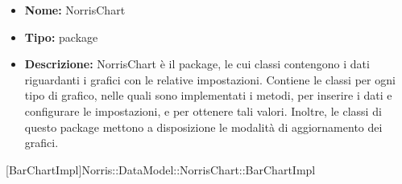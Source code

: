 	

			\begin{itemize}
			\item \textbf{Nome:} NorrisChart
			\item \textbf{Tipo:} package
			
			\item \textbf{Descrizione:} NorrisChart è il package, le cui classi contengono i dati riguardanti i grafici con le relative impostazioni. Contiene le classi per ogni tipo di grafico, nelle quali sono implementati i metodi, per inserire i dati e configurare le impostazioni, e per ottenere tali valori. Inoltre, le classi di questo package mettono a disposizione le modalità di aggiornamento dei grafici.
			\end{itemize}

			
			[BarChartImpl]{Norris::DataModel::NorrisChart::BarChartImpl}
			

	
